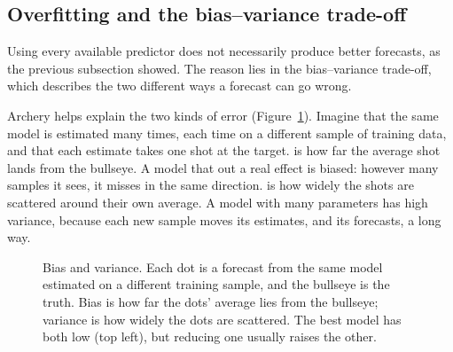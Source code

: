 \subsection{Overfitting and the bias--variance trade-off}
\label{sec:20-biasvar}

Using every available predictor does not necessarily produce better forecasts, as the previous subsection showed. The reason lies in the bias--variance trade-off, which describes the two different ways a forecast can go wrong.

Archery helps explain the two kinds of error (Figure~\ref{fig:20-targets}). Imagine that the same model is estimated many times, each time on a different sample of training data, and that each estimate takes one shot at the target.  is how far the average shot lands from the bullseye. A model that  out a real effect is biased: however many samples it sees, it misses in the same direction.  is how widely the shots are scattered around their own average. A model with many parameters has high variance, because each new sample moves its estimates, and its forecasts, a long way.

\begin{figure}[htbp]
  \centering
  \caption{Bias and variance. Each dot is a forecast from the same model
    estimated on a different training sample, and the bullseye is the truth.
    Bias is how far the dots' average lies from the bullseye; variance is how
    widely the dots are scattered. The best model has both low (top left), but
    reducing one usually raises the other.}
  \label{fig:20-targets}
\end{figure}

